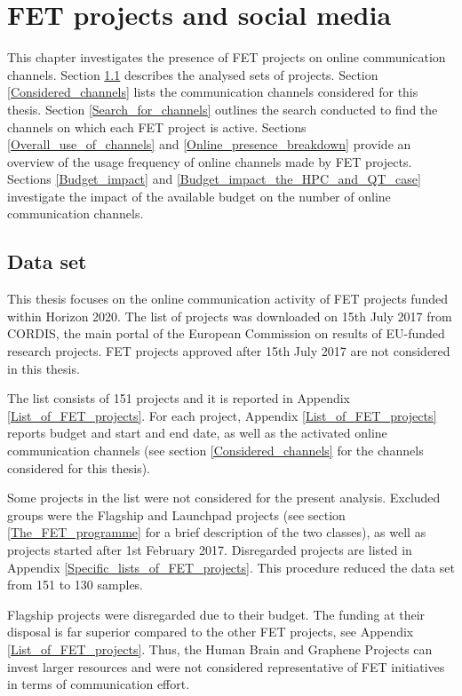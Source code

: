 \chapter{FET projects and social media}
This chapter investigates the presence of FET projects on online communication channels. Section \ref{Data_set} describes the analysed sets of projects. Section \ref{Considered_channels} lists the communication channels considered for this thesis. Section \ref{Search_for_channels} outlines the search conducted to find the channels on which each FET project is active. Sections \ref{Overall_use_of_channels} and \ref{Online_presence_breakdown} provide an overview of the usage frequency of online channels made by FET projects. Sections \ref{Budget_impact} and \ref{Budget_impact_the_HPC_and_QT_case} investigate the impact of the available budget on the number of online communication channels.

\section{Data set} \label{Data_set}
This thesis focuses on the online communication activity of FET projects funded within Horizon 2020. The list of projects was downloaded on 15th July 2017 from CORDIS, the main portal of the European Commission on results of EU-funded research projects\cite{CORDIS}. FET projects approved after 15th July 2017 are not considered in this thesis.

The list consists of 151 projects and it is reported in Appendix \ref{List_of_FET_projects}. For each project, Appendix \ref{List_of_FET_projects} reports budget and start and end date, as well as the activated online communication channels (see section \ref{Considered_channels} for the channels considered for this thesis).   

Some projects in the list were not considered for the present analysis. Excluded groups were the Flagship and Launchpad projects (see section \ref{The_FET_programme} for a brief description of the two classes), as well as projects started after 1st February 2017. Disregarded projects are listed in Appendix \ref{Specific_lists_of_FET_projects}. This procedure reduced the data set from 151 to 130 samples.

Flagship projects were disregarded due to their budget. The funding at their disposal is far superior compared to the other FET projects, see Appendix \ref{List_of_FET_projects}. Thus, the Human Brain and Graphene Projects can invest larger resources and were not considered representative of FET initiatives in terms of communication effort. 

